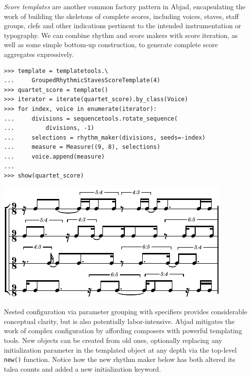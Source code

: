 \documentclass{article}
\begin{document}
\noindent \emph{Score templates} are another common factory pattern in Abjad,
encapsulating the work of building the skeletons of complete scores, including
voices, staves, staff groups, clefs and other indications pertinent to the
intended instrumentation or typography. We can combine rhythm and score makers
with score iteration, as well as some simple bottom-up construction, to
generate complete score aggregates expressively.

\begin{lstlisting}
>>> template = templatetools.\
...     GroupedRhythmicStavesScoreTemplate(4)
>>> quartet_score = template()
>>> iterator = iterate(quartet_score).by_class(Voice)
>>> for index, voice in enumerate(iterator):
...     divisions = sequencetools.rotate_sequence(
...         divisions, -1)
...     selections = rhythm_maker(divisions, seeds=-index)
...     measure = Measure((9, 8), selections)
...     voice.append(measure)
...
>>> show(quartet_score)
\end{lstlisting}
\includegraphics{assets/lilypond-07f633b33deadb5b938f688d727585f0.pdf}

\noindent Nested configuration via parameter grouping with specifiers provides
considerable conceptual clarity, but is also potentially labor-intensive. Abjad
mitigates the work of complex configuration by affording composers with
powerful templating tools. New objects can be created from old ones, optionally
replacing any initialization parameter in the templated object at any depth via
the top-level \texttt{new()} function. Notice how the new rhythm maker below
has both altered its talea counts and added a new initialization keyword.
\end{document}
